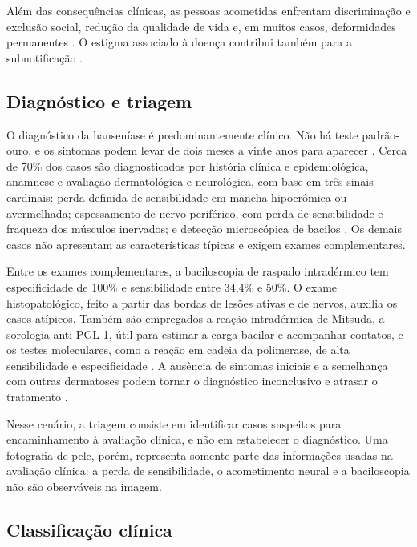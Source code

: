 Além das consequências clínicas, as pessoas acometidas enfrentam
discriminação e exclusão social, redução da qualidade de vida e, em muitos
casos, deformidades permanentes \cite{fernandes2024}. O estigma associado à
doença contribui também para a subnotificação \cite{lima2024skin}.

\subsection{Diagnóstico e triagem}

O diagnóstico da hanseníase é predominantemente clínico. Não há teste
padrão-ouro, e os sintomas podem levar de dois meses a vinte anos para
aparecer \cite{fernandes2024}. Cerca de 70\% dos casos são diagnosticados por
história clínica e epidemiológica, anamnese e avaliação dermatológica e
neurológica, com base em três sinais cardinais: perda definida de
sensibilidade em mancha hipocrômica ou avermelhada; espessamento de nervo
periférico, com perda de sensibilidade e fraqueza dos músculos inervados; e
detecção microscópica de bacilos \cite{fernandes2024,oms2018hanseniase}. Os
demais casos não apresentam as características típicas e exigem exames
complementares.

Entre os exames complementares, a baciloscopia de raspado intradérmico tem
especificidade de 100\% e sensibilidade entre 34,4\% e 50\%. O exame
histopatológico, feito a partir das bordas de lesões ativas e de nervos, auxilia
os casos atípicos. Também são empregados a reação intradérmica de Mitsuda, a
sorologia anti-PGL-1, útil para estimar a carga bacilar e acompanhar contatos,
e os testes moleculares, como a reação em cadeia da polimerase, de alta
sensibilidade e especificidade \cite{fernandes2024}. A ausência de sintomas
iniciais e a semelhança com outras dermatoses podem tornar o diagnóstico
inconclusivo e atrasar o tratamento \cite{fernandes2024}.

Nesse cenário, a triagem consiste em identificar casos suspeitos para
encaminhamento à avaliação clínica, e não em estabelecer o diagnóstico. Uma fotografia de pele,
porém, representa somente parte das informações usadas na avaliação clínica:
a perda de sensibilidade, o acometimento neural e a baciloscopia não são
observáveis na imagem.

\subsection{Classificação clínica}

